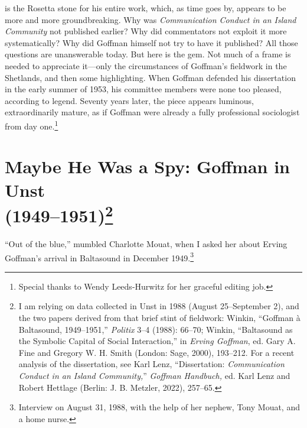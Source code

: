 \documentclass[openany,nobib]{tufte-book}
\begin{document}
\emph{}

\vspace{0.5in}

is the Rosetta stone for his entire work,
which, as time goes by, appears to be more and more groundbreaking. Why
was \emph{Communication Conduct in an Island Community} not published
earlier? Why did commentators not exploit it more systematically? Why
did Goffman himself not try to have it published? All those questions
are unanswerable today. But here is the gem. Not much of a frame is
needed to appreciate it---only the circumstances of Goffman's fieldwork
in the Shetlands, and then some highlighting. When Goffman defended his
dissertation in the early summer of 1953, his committee members were
none too pleased, according to legend. Seventy years later, the piece
appears luminous, extraordinarily mature, as if Goffman were already a
fully professional sociologist from day one.\footnote{Special thanks to
  Wendy Leeds-Hurwitz for her graceful editing job.}

\hypertarget{maybe-he-was-a-spy-goffman-in-unst-19491951}{%
\section[Maybe He Was a Spy: Goffman in Unst
(1949--1951)]{\texorpdfstring{Maybe He Was a Spy: Goffman in Unst\\
(1949--1951)\footnote{I am relying on data collected in Unst in 1988
  (August 25--September 2), and the two papers derived from that brief
  stint of fieldwork: Winkin, ``Goffman à Baltasound, 1949--1951,''
  \emph{Politix} 3--4 (1988): 66--70; Winkin, ``Baltasound as the
  Symbolic Capital of Social Interaction,'' in \emph{Erving Goffman},
  ed. Gary A. Fine and Gregory W. H. Smith (London: Sage, 2000),
  193--212. For a recent analysis of the dissertation, see Karl Lenz,
  ``Dissertation: \emph{Communication Conduct in an Island Community,}''
  \emph{Goffman Handbuch,} ed. Karl Lenz and Robert Hettlage (Berlin: J.
  B. Metzler, 2022), 257--65.}}{Maybe He Was a Spy: Goffman in Unst (1949--1951)}}\label{maybe-he-was-a-spy-goffman-in-unst-19491951}}

``Out of the blue,'' mumbled Charlotte Mouat, when I asked her about
Erving Goffman's arrival in Baltasound in December 1949.\footnote{Interview
  on August 31, 1988, with the help of her nephew, Tony Mouat, and a
  home nurse.}
\end{document}
